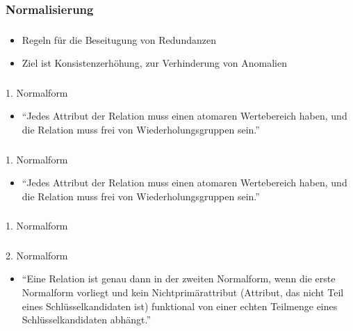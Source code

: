 \documentclass[aspectratio=169,14pt,xcolor=dvipsnames]{beamer}
\begin{document}
\begin{frame}[t]
    \frametitle{\subsecname}
    \framesubtitle{\subsubsecname}
    
\end{frame}

\subsubsection{Normalisierung}
\begin{frame}[t]
    \frametitle{\subsecname}
    \framesubtitle{\subsubsecname}
    \begin{itemize}
        \item Regeln für die Beseitugung von Redundanzen
        \item Ziel ist Konsistenzerhöhung, zur Verhinderung von Anomalien
    \end{itemize}
\end{frame}

\begin{frame}[t]
    \frametitle{\subsecname}
    \framesubtitle{\subsubsecname}
    1. Normalform
    \begin{itemize}
        \item "`Jedes Attribut der Relation muss einen atomaren Wertebereich haben, und die Relation muss frei von Wiederholungsgruppen sein."'
    \end{itemize}
    \pause
    
\end{frame}

\begin{frame}[t]
    \frametitle{\subsecname}
    \framesubtitle{\subsubsecname}
    1. Normalform
    \begin{itemize}
        \item "`Jedes Attribut der Relation muss einen atomaren Wertebereich haben, und die Relation muss frei von Wiederholungsgruppen sein."'
    \end{itemize}
    
\end{frame}

\begin{frame}[t]
    \frametitle{\subsecname}
    \framesubtitle{\subsubsecname}
    1. Normalform
    
\end{frame}

\begin{frame}[t]
    \frametitle{\subsecname}
    \framesubtitle{\subsubsecname}
    2. Normalform
    \begin{itemize}
        \item "`Eine Relation ist genau dann in der zweiten Normalform, wenn die erste Normalform vorliegt und kein Nichtprimärattribut (Attribut, das nicht Teil eines Schlüsselkandidaten ist) funktional von einer echten Teilmenge eines Schlüsselkandidaten abhängt."'
    \end{itemize}
    \pause 
    
\end{frame}
\end{document}
